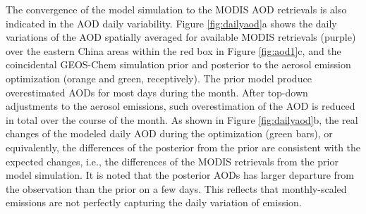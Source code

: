  The convergence of the model simulation to the MODIS AOD retrievals 
 is also indicated in the AOD daily variability. 
 Figure \ref{fig:dailyaod}a shows the daily variations of the AOD 
 spatially averaged for available MODIS retrievals (purple) over the eastern China areas 
 within the red box in Figure \ref{fig:aod1}c, and the coincidental GEOS-Chem simulation
 prior and posterior to the aerosol emission optimization (orange and green, receptively).
 The prior model produce overestimated AODs for most days during the month.
 After top-down adjustments to the aerosol emissions,
 such overestimation of the AOD is reduced in total over the course of the month.
 As shown in Figure \ref{fig:dailyaod}b, the real changes of the modeled daily AOD 
 during the optimization (green bars), or equivalently, the differences of the posterior
 from the prior are consistent with the expected changes, i.e.,
 the differences of the MODIS retrievals from the prior model simulation.
 It is noted that the posterior AODs has larger departure from the observation
 than the prior on a few days.
 This reflects that monthly-scaled emissions are not perfectly capturing the daily variation of emission.

